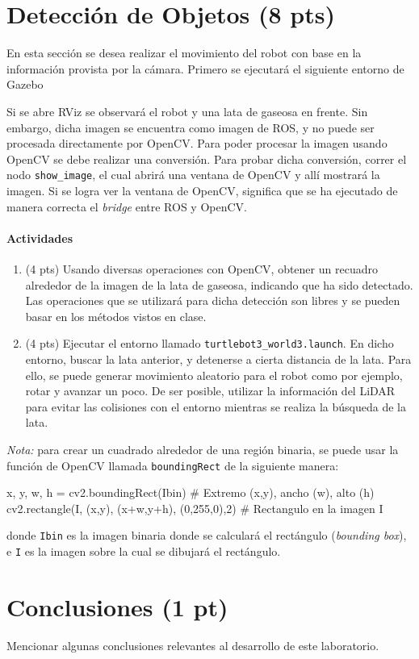 \documentclass[a4paper,11pt]{robotlabs}
\begin{document}
\section{Detección de Objetos (8 pts)}


En esta sección se desea realizar el movimiento del robot con base en la
información provista por la cámara. Primero se ejecutará el siguiente entorno
de Gazebo

\noindent Si se abre RViz se observará el robot y una lata de gaseosa en
frente. Sin embargo, dicha imagen se encuentra como imagen de ROS, y no puede
ser procesada directamente por OpenCV. Para poder procesar la imagen usando
OpenCV se debe realizar una conversión. Para probar dicha conversión, correr el
nodo \texttt{show\_image}, el cual abrirá una ventana de OpenCV y allí mostrará
la imagen. Si se logra ver la ventana de OpenCV, significa que se ha ejecutado
de manera correcta el \textit{bridge} entre ROS y OpenCV.

\paragraph{Actividades}
\begin{enumerate}
\item (4 pts) Usando diversas operaciones con OpenCV, obtener un recuadro
  alrededor de la imagen de la lata de gaseosa, indicando que ha sido
  detectado. Las operaciones que se utilizará para dicha detección son libres y
  se pueden basar en los métodos vistos en clase.
\item (4 pts) Ejecutar el entorno llamado
  \texttt{turtlebot3\_world3.launch}. En dicho entorno, buscar la lata
  anterior, y detenerse a cierta distancia de la lata. Para ello, se puede
  generar movimiento aleatorio para el robot como por ejemplo, rotar y avanzar
  un poco. De ser posible, utilizar la información del LiDAR para evitar las
  colisiones con el entorno mientras se realiza la búsqueda de la lata.

\end{enumerate}

\noindent *\textit{Nota:} para crear un cuadrado alrededor de una región
binaria, se puede usar la función de OpenCV llamada \texttt{boundingRect} de la
siguiente manera:
\begin{listingpython2}
x, y, w, h = cv2.boundingRect(Ibin) # Extremo (x,y), ancho (w), alto (h)
cv2.rectangle(I, (x,y), (x+w,y+h), (0,255,0),2) # Rectangulo en la imagen I
\end{listingpython2}
\noindent donde \texttt{Ibin} es la imagen binaria donde se calculará el
rectángulo (\textit{bounding box}), e \texttt{I} es la imagen sobre la cual se
dibujará el rectángulo.


\section{Conclusiones (1 pt)}
Mencionar algunas conclusiones relevantes al desarrollo de este laboratorio.
\end{document}
